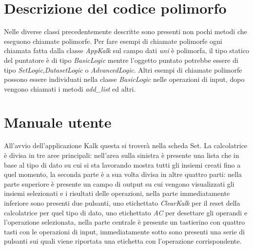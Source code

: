 \documentclass[a4paper,10pt]{article}
\begin{document}
        \section{Descrizione del codice polimorfo}
        Nelle diverse classi precedentemente descritte sono presenti non pochi metodi che eseguono chiamate polimorfe.
        Per fare esempi di chiamate polimorfe ogni chiamata fatta dalla classe \textit{AppKalk} sul campo dati \textit{uni} è polimorfa, il tipo statico del puntatore è di tipo \textit{BasicLogic} mentre l'oggetto puntato potrebbe essere di tipo \textit{SetLogic},\textit{DatasetLogic} o \textit{AdvancedLogic}.
        Altri esempi di chiamate polimorfe possono essere individuati nella classe \textit{BasicLogic} nelle operazioni di input, dopo vengono chiamati i metodi \textit{add\_list} ed altri.

        \se

        \section{Manuale utente}
        All’avvio dell’applicazione Kalk questa si troverà nella scheda Set. 
        La calcolatrice è divisa in tre aree principali: nell’area sulla sinistra è presente una lista che in base al tipo di dato su cui si sta lavorando mostra tutti gli insiemi creati fino a quel momento, la seconda parte è a sua volta divisa in altre quattro parti: nella parte superiore è presente un campo di output su cui vengono visualizzati gli insiemi selezionati e i risultati delle operazioni, nella parte immediatamente inferiore sono presenti due pulsanti, uno etichettato \textit{ClearKalk} per il reset della calcolatrice per quel tipo di dato, uno etichettato \textit{AC} per desettare gli operandi e l'operazione selezionata, nella parte centrale è presente un tastierino con quattro tasti con le operazioni di input, immediatamente sotto sono presenti una serie di pulsanti sui quali viene riportata una etichetta con l’operazione corrispondente.
\end{document}
